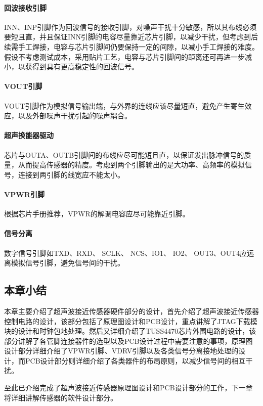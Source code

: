 \paragraph{回波接收引脚}
INN、INP引脚作为回波信号的接收引脚，对噪声干扰十分敏感，所以其布线必须要短且直，并且保证INN引脚的电容尽量靠近芯片引脚，以减少干扰，但考虑到后续需手工焊接，电容与芯片引脚间仍要保持一定的间隙，以减小手工焊接的难度。假设不考虑测试成本，采用贴片工艺，电容与芯片引脚间的距离还可再进一步减小，以获得到具有更高稳定性的回波信号。
\paragraph{VOUT引脚}
VOUT引脚作为模拟信号输出端，与外界的连线应该尽量短直，避免产生寄生效应，以及外部噪声干扰引起的噪声耦合。\par
\paragraph{超声换能器驱动}
芯片与OUTA、OUTB引脚间的布线应尽可能短且直，以保证发出脉冲信号的质量，从而提高传感器的精度。考虑到两个引脚输出的是大功率、高频率的模拟信号，连接到两引脚的线宽应不能太小。\par
\paragraph{VPWR引脚}
根据芯片手册推荐，VPWR的解调电容应尽可能靠近引脚。\par
\paragraph{信号分离}
数字信号引脚如TXD、RXD、 SCLK、 NCS、IO1、 IO2、 OUT3、OUT4应远离模拟信号引脚，避免信号间的干扰。\par
\subsection{本章小结}
本章主要介绍了超声波接近传感器硬件部分的设计，首先介绍了超声波接近传感器控制电路的设计，该部分包括了原理图设计和PCB设计，重点讲解了JTAG下载模块的设计和时钟包地处理。然后又详细介绍了TUSS4470芯片外围电路的设计，该部分讲解了各管脚连接器件的选型以及PCB设计过程中需要注意的事项，原理图设计部分详细介绍了VPWR引脚、VDRV引脚以及各类信号分离接地处理的设计，而PCB设计部分则详细介绍了各类器件的布局原则，以减少信号间的相互干扰。\par
至此已介绍完成了超声波接近传感器原理图设计和PCB设计部分的工作，下一章将详细讲解传感器的软件设计部分。




